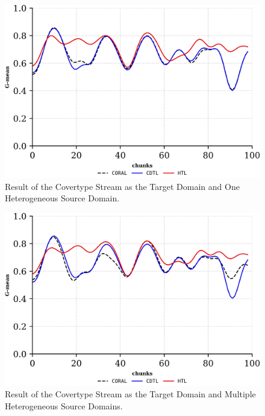 \begin{figure}[!ht]
	\centering
	\includegraphics[width=1\linewidth]{6_transfer_learning/figures/exp2_0.png}
	\caption{Result of the Covertype Stream as the Target Domain and One Heterogeneous Source Domain.}
	\label{fig:6_exp3}
\end{figure}
\begin{figure}[!ht]
	\centering
	\includegraphics[width=1\linewidth]{6_transfer_learning/figures/exp2_1.png}
	\caption{Result of the Covertype Stream as the Target Domain and Multiple Heterogeneous Source Domains.}
	\label{fig:6_exp4}
\end{figure}
